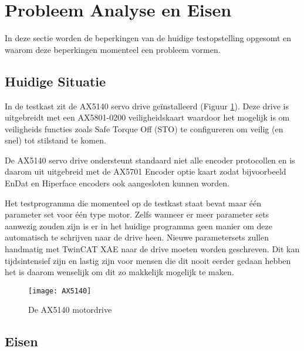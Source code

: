 \section{Probleem Analyse en Eisen} \label{sec:ProbleemAnalyseEnEisen}

In deze sectie worden de beperkingen van de huidige testopstelling opgesomt en waarom deze beperkingen momenteel een probleem vormen.

\subsection{Huidige Situatie}

In de testkast zit de \gls{AX5140} \cite{web:AX5140Drive} servo drive geïnstalleerd (Figuur \ref{fig:AX5140}). Deze drive is uitgebreidt met een \gls{AX5801}-0200 \cite{web:AX5801} veiligheidskaart waardoor het mogelijk is om veiligheids functies zoals Safe Torque Off (\gls{STO}) te configureren om veilig (en snel) tot stilstand te komen.

\vspace{0.5cm}

De \gls{AX5140} servo drive ondersteunt standaard niet alle encoder protocollen en is daarom uit uitgebreid met de \gls{AX5701} \cite{web:AX5701} Encoder optie kaart zodat bijvoorbeeld EnDat en Hiperface encoders ook aangesloten kunnen worden.

\vspace{0.5cm}

Het testprogramma die momenteel op de testkast staat bevat maar één parameter set voor één type motor. Zelfs wanneer er meer parameter sets aanwezig zouden zijn is er in het huidige programma geen manier om deze automatisch te schrijven naar de drive heen. Nieuwe parametersets zullen handmatig met \gls{TwinCAT} XAE \cite{web:DriveManager2} naar de drive moeten worden geschreven. Dit kan tijdsintensief zijn en lastig zijn voor mensen die dit nooit eerder gedaan hebben het is daarom wenselijk om dit zo makkelijk mogelijk te maken.

\begin{figure}[h]
	\centering
	\texttt{[image: AX5140]}
	\label{fig:AX5140}
	\caption{De \gls{AX5140} motordrive \cite{web:AX5140Drive}}
\end{figure}

\newpage

\subsection{Eisen}

